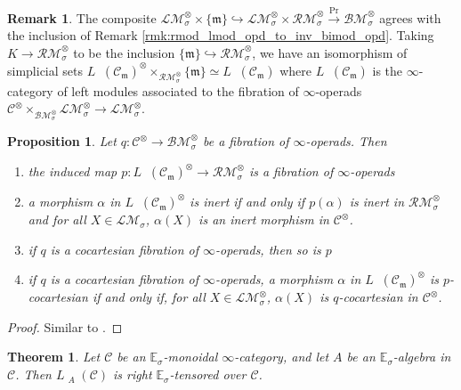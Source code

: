 \documentclass{article}
\DeclareMathOperator{\Modh}{{}^{\sigma}Mod} %
\newcommand{\EE}{\mathbb{E}}
\newtheorem{theorem}[equation]{Theorem}
\newtheorem{proposition}[equation]{Proposition}
\theoremstyle{definition}
\newtheorem{remark}[equation]{Remark}
\begin{document}
\begin{remark}
   The composite $ \mathcal{LM}^\otimes_\sigma \times \{\mathfrak{m}\} \hookrightarrow \mathcal{LM}^\otimes_\sigma \times \mathcal{RM}^\otimes_\sigma \xrightarrow{\mathrm{Pr}} \mathcal{BM}^\otimes_\sigma $ agrees with the inclusion of Remark \ref{rmk:rmod_lmod_opd_to_inv_bimod_opd}. 
   Taking $ K \to \mathcal{RM}^\otimes_\sigma $ to be the inclusion $ \{\mathfrak{m}\} \hookrightarrow \mathcal{RM}^\otimes_\sigma $, we have an isomorphism of simplicial sets $ L\Modh(\mathcal{C}_{\mathfrak{m}})^\otimes \times_{\mathcal{RM}^\otimes_\sigma} \{\mathfrak{m}\} \simeq L\Modh(\mathcal{C}_{\mathfrak{m}}) $ where $ L\Modh(\mathcal{C}_{\mathfrak{m}}) $ is the $ \infty $-category of left modules associated to the fibration of $ \infty $-operads $ \mathcal{C}^\otimes \times_{\mathcal{BM}^\otimes_{\sigma}} \mathcal{LM}^\otimes_\sigma \to \mathcal{LM}^\otimes_\sigma $. 
\end{remark} 
\begin{proposition}
    Let $ q \colon \mathcal{C}^\otimes \to \mathcal{BM}^\otimes_\sigma $ be a fibration of $ \infty $-operads. Then
    \begin{enumerate}[label=(\arabic*)]
        \item the induced map $ p \colon L\Modh(\mathcal{C}_{\mathfrak{m}})^\otimes \to \mathcal{RM}^\otimes_\sigma $ is a fibration of $ \infty $-operads 
        \item a morphism $ \alpha $ in $ L\Modh(\mathcal{C}_{\mathfrak{m}})^\otimes $ is inert if and only if $ p (\alpha) $ is inert in $ \mathcal{RM}^\otimes_\sigma $ and for all $ X \in \mathcal{LM}_\sigma $, $ \alpha(X) $ is an inert morphism in $ \mathcal{C}^\otimes $. 
        \item if $ q $ is a cocartesian fibration of $ \infty $-operads, then so is $ p $
        \item if $ q $ is a cocartesian fibration of $ \infty $-operads, a morphism $ \alpha $ in $ L\Modh(\mathcal{C}_{\mathfrak{m}})^\otimes $ is $ p $-cocartesian if and only if, for all $ X \in \mathcal{LM}^\otimes_\sigma $, $ \alpha(X) $ is $ q $-cocartesian in $ \mathcal{C}^\otimes $. 
    \end{enumerate}
\end{proposition}
\begin{proof}
    Similar to \cite[Proposition 4.3.2.5]{LurHA}.    
\end{proof}
\begin{theorem}
    Let $ \mathcal{C} $ be an $ \EE_\sigma $-monoidal $ \infty $-category, and let $ A $ be an $ \EE_\sigma $-algebra in $ \mathcal{C} $. 
    Then $ L\Modh_A(\mathcal{C}) $ is right $ \EE_\sigma $-tensored over $ \mathcal{C} $. 
\end{theorem}
\end{document}
